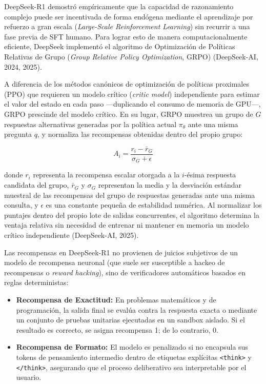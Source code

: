 DeepSeek-R1 demostró empíricamente que la capacidad de razonamiento complejo puede ser incentivada de forma endógena mediante el aprendizaje por refuerzo a gran escala (\textit{Large-Scale Reinforcement Learning}) sin recurrir a una fase previa de SFT humano. Para lograr esto de manera computacionalmente eficiente, DeepSeek implementó el algoritmo de Optimización de Políticas Relativas de Grupo (\textit{Group Relative Policy Optimization}, GRPO) (DeepSeek-AI, 2024, 2025).

A diferencia de los métodos canónicos de optimización de políticas proximales (PPO) que requieren un modelo crítico (\textit{critic model}) independiente para estimar el valor del estado en cada paso ---duplicando el consumo de memoria de GPU---, GRPO prescinde del modelo crítico. En su lugar, GRPO muestrea un grupo de $G$ respuestas alternativas generadas por la política actual $\pi_\theta$ ante una misma pregunta $q$, y normaliza las recompensas obtenidas dentro del propio grupo:

\begin{equation}
    A_i = \frac{r_i - \bar{r}_G}{\sigma_G + \epsilon}
    \label{eq:grpo_advantage}
\end{equation}

donde $r_i$ representa la recompensa escalar otorgada a la $i$-ésima respuesta candidata del grupo, $\bar{r}_G$ y $\sigma_G$ representan la media y la desviación estándar muestral de las recompensas del grupo de respuestas generadas ante una misma consulta, y $\epsilon$ es una constante pequeña de estabilidad numérica. Al normalizar los puntajes dentro del propio lote de salidas concurrentes, el algoritmo determina la ventaja relativa sin necesidad de entrenar ni mantener en memoria un modelo crítico independiente (DeepSeek-AI, 2025).

Las recompensas en DeepSeek-R1 no provienen de juicios subjetivos de un modelo de recompensa neuronal (que suele ser susceptible a hackeo de recompensas o \textit{reward hacking}), sino de verificadores automáticos basados en reglas deterministas:
\begin{itemize}
    \item \textbf{Recompensa de Exactitud:} En problemas matemáticos y de programación, la salida final se evalúa contra la respuesta exacta o mediante un conjunto de pruebas unitarias ejecutadas en un sandbox aislado. Si el resultado es correcto, se asigna recompensa 1; de lo contrario, 0.
    \item \textbf{Recompensa de Formato:} El modelo es penalizado si no encapsula sus tokens de pensamiento intermedio dentro de etiquetas explícitas \texttt{<think>} y \texttt{</think>}, asegurando que el proceso deliberativo sea interpretable por el usuario.
\end{itemize}

